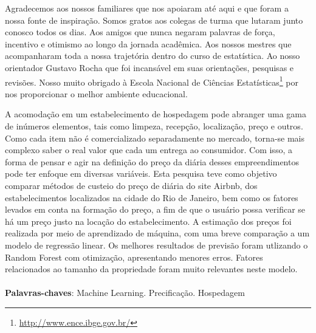 \documentclass[
	12pt,				%
	a4paper,		%
	oneside,    %
	chapter=TITLE,		   %
	section=TITLE,		   %
	subsection=TITLE,	   %
	subsubsection=TITLE, %
	english,			%
	french,				%
	spanish,			%
	brazil,				%
]{abntex2}
\begin{document}
\pretextual

\makeindex

\imprimircapa

\imprimirfolhaderosto*





\begin{agradecimentos}
	Agradecemos aos nossos familiares que nos apoiaram até aqui e que foram
a nossa fonte de inspiração. Somos gratos aos colegas de turma que
lutaram junto conosco todos os dias. Aos amigos que nunca negaram
palavras de força, incentivo e otimismo ao longo da jornada acadêmica.
Aos nossos mestres que acompanharam toda a nossa trajetória dentro do
curso de estatística. Ao nosso orientador Gustavo Rocha que foi
incansável em suas orientações, pesquisas e revisões. Nosso muito
obrigado à Escola Nacional de Ciências
Estatísticas\footnote{\url{http://www.ence.ibge.gov.br/}} por nos
proporcionar o melhor ambiente educacional.
\end{agradecimentos}


\setlength{\absparsep}{18pt} %
\begin{resumo}
	A acomodação em um estabelecimento de hospedagem pode abranger uma gama
de inúmeros elementos, tais como limpeza, recepção, localização, preço e
outros. Como cada item não é comercializado separadamente no mercado,
torna-se mais complexo saber o real valor que cada um entrega ao
consumidor. Com isso, a forma de pensar e agir na definição do preço da
diária desses empreendimentos pode ter enfoque em diversas variáveis.
Esta pesquisa teve como objetivo comparar métodos de custeio do preço de
diária do site Airbnb, dos estabelecimentos localizados na cidade do Rio
de Janeiro, bem como os fatores levados em conta na formação do preço, a
fim de que o usuário possa verificar se há um preço justo na locação do
estabelecimento. A estimação dos preços foi realizada por meio de
aprendizado de máquina, com uma breve comparação a um modelo de
regressão linear. Os melhores resultados de previsão foram utlizando o
Random Forest com otimização, apresentando menores erros. Fatores
relacionados ao tamanho da propriedade foram muito relevantes neste
modelo.
	\noindent
	\\
	\\
	\textbf{Palavras-chaves}: Machine Learning. Precificação. Hospedagem
\end{resumo}
\end{document}
